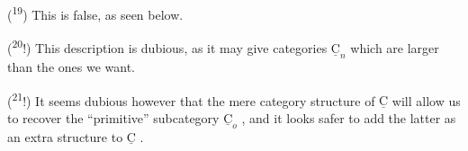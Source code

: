 (\textsuperscript{19}\deleted{\unsure{)}}\unsure{!}) This is false, as seen below.

(\textsuperscript{20}\deleted{)}!) This description is dubious, as it may give categories $\underline{\mathrm{C}}_{n}$ which are larger than the ones we want.

(\textsuperscript{21}!) It seems dubious however that the mere category structure of $\underline{\mathrm{C}}$ will allow us to recover the  ``primitive'' subcategory $\underline{\mathrm{C}}_{o}$ , and it looks safer to add the latter as an extra structure to $\underline{\mathrm{C}}$ .
